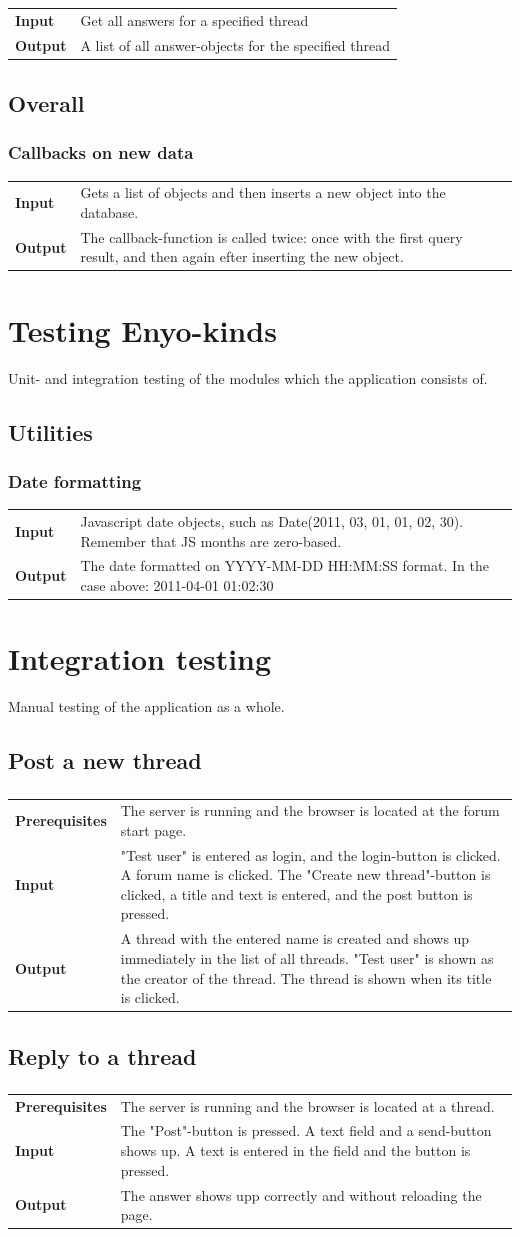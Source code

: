 \documentclass[a4paper, 12pt, titlepage]{article}
\newcommand{\testcase}[2]{
	\subsubsection{}
	\begin{tabular}{l p{11cm}}
	\bf{Input} & 
		#1\\
	\bf{Output} & 
		#2\\
	\end{tabular}
}
\newcommand{\ttestcase}[3]{
	\subsubsection{#1}
	\begin{tabular}{l p{11cm}}
	\bf{Input} & 
		#2\\
	\bf{Output} & 
		#3\\
	\end{tabular}
}
\newcommand{\ptestcase}[3]{
	\subsubsection{}
	\begin{tabular}{l p{10cm}}
	\bf{Prerequisites} & 
		#1\\
	\bf{Input} & 
		#2\\
	\bf{Output} & 
		#3\\
	\end{tabular}
}
\begin{document}
		\testcase
		{
			Get all answers for a specified thread
		}{
			A list of all answer-objects for the specified thread
		}


	\subsection{Overall}

		\ttestcase{Callbacks on new data}
		{
			Gets a list of objects and then inserts a new object into the database.
		}{
			The callback-function is called twice: once with the first query result, and then again efter inserting the new object.
		}

	\section{Testing Enyo-kinds}
	Unit- and integration testing of the modules which the application consists of.

	\subsection{Utilities}

		\ttestcase{Date formatting}
		{
			Javascript date objects, such as Date(2011, 03, 01, 01, 02, 30). Remember that JS months are zero-based.
		}{
			The date formatted on YYYY-MM-DD HH:MM:SS format. In the case above:
			2011-04-01 01:02:30
		}

	\section{Integration testing}
	Manual testing of the application as a whole.

	\subsection{Post a new thread}
		\ptestcase{
			The server is running and the browser is located at the forum start page.
		}{
			"Test user" is entered as login, and the login-button is clicked.
			A forum name is clicked. The "Create new thread"-button is clicked, a title and text is entered, and the post button is pressed. 
		}{
			A thread with the entered name is created and shows up immediately in the list of all threads. "Test user" is shown as the creator of the thread. The thread is shown when its title is clicked.
		}


	\subsection{Reply to a thread}
		\ptestcase{
			The server is running and the browser is located at a thread.
		}{
			The "Post"-button is pressed. A text field and a send-button shows up. A text is entered in the field and the button is pressed.
		}{
			The answer shows upp correctly and without reloading the page.
		}
\end{document}
